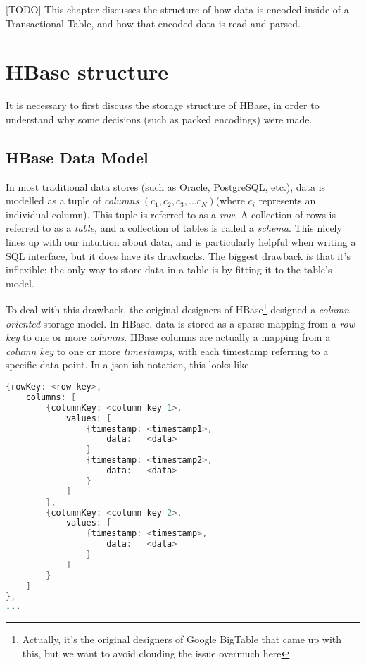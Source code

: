 [TODO] This chapter discusses the structure of how data is encoded inside of a Transactional Table, and how that encoded data is read and parsed.

\section{HBase structure}
It is necessary to first discuss the storage structure of HBase, in order to understand why some decisions (such as packed encodings) were made.

\subsection{HBase Data Model}
In most traditional data stores (such as Oracle, PostgreSQL, etc.), data is modelled as a tuple of \emph{columns} $(c_1,c_2,c_3,...c_N)$(where $c_i$ represents an individual column). This tuple is referred to as a \emph{row}. A collection of rows is referred to as a \emph{table}, and a collection of tables is called a \emph{schema}. This nicely lines up with our intuition about data, and is particularly helpful when writing a SQL interface, but it does have its drawbacks. The biggest drawback is that it's inflexible: the only way to store data in a table is by fitting it to the table's model. 

To deal with this drawback, the original designers of HBase\footnote{Actually, it's the original designers of Google BigTable that came up with this, but we want to avoid clouding the issue overmuch here} designed a \emph{column-oriented} storage model. In HBase, data is stored as a sparse mapping from a \emph{row key} to one or more \emph{columns}. HBase columns are actually a mapping from a \emph{column key} to one or more \emph{timestamps}, with each timestamp referring to a specific data point. In a json-ish notation, this looks like

\begin{minipage}{\linewidth}
\begin{lstlisting}[frame=single,language=java,captionpos=b,caption=HBase data model]
{rowKey: <row key>,
	columns: [
		{columnKey: <column key 1>,
			values: [
				{timestamp: <timestamp1>,
					data:	<data>
				}
				{timestamp: <timestamp2>,
					data:	<data>
				}
			]	
		},		
		{columnKey: <column key 2>,
			values: [
				{timestamp: <timestamp>,
					data:	<data>
				}
			]	
		}		
	]
},
...
\end{lstlisting}
\end{minipage}

